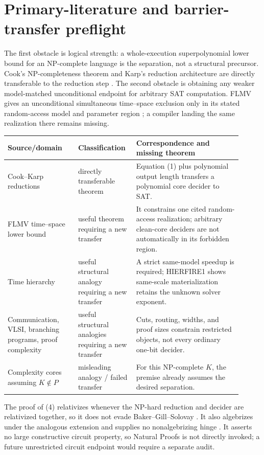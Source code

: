 \documentclass[11pt]{article}
\begin{document}
\section{Primary-literature and barrier-transfer preflight}

The first obstacle is logical strength: a whole-execution superpolynomial
lower bound for an NP-complete language is the separation, not a structural
precursor.  Cook's NP-completeness theorem and Karp's reduction architecture
are directly transferable to the reduction step \cite{Cook71,Karp72}.  The
second obstacle is obtaining any weaker model-matched unconditional endpoint
for arbitrary SAT computation.  FLMV gives an unconditional simultaneous
time--space exclusion only in its stated random-access model and parameter
region \cite{FLMV05}; a compiler landing the same realization there remains
missing.

\begin{longtable}{p{0.28\linewidth}p{0.21\linewidth}p{0.42\linewidth}}
\toprule Source/domain & Classification & Correspondence and missing theorem\\ \midrule
Cook--Karp reductions & directly transferable theorem & Equation (1) plus
polynomial output length transfers a polynomial core decider to SAT.\\
FLMV time--space lower bound & useful theorem requiring a new transfer & It
constrains one cited random-access realization; arbitrary clean-core deciders
are not automatically in its forbidden region.\\
Time hierarchy & useful structural analogy requiring a new transfer & A
strict same-model speedup is required; HIERFIRE1 shows same-scale
materialization retains the unknown solver exponent.\\
Communication, VLSI, branching programs, proof complexity & useful
structural analogies requiring a new transfer & Cuts, routing, widths, and
proof sizes constrain restricted objects, not every ordinary one-bit decider.\\
Complexity cores assuming \(K\notin P\) & misleading analogy / failed
transfer & For this NP-complete \(K\), the premise already assumes the
desired separation.\\
\bottomrule
\end{longtable}

The proof of (4) relativizes whenever the NP-hard reduction and decider are
relativized together, so it does not evade Baker--Gill--Solovay
\cite{BGS75}.  It also algebrizes under the analogous extension and supplies
no nonalgebrizing hinge \cite{AW09}.  It asserts no large constructive circuit
property, so Natural Proofs is not directly invoked; a future unrestricted
circuit endpoint would require a separate audit.
\end{document}
